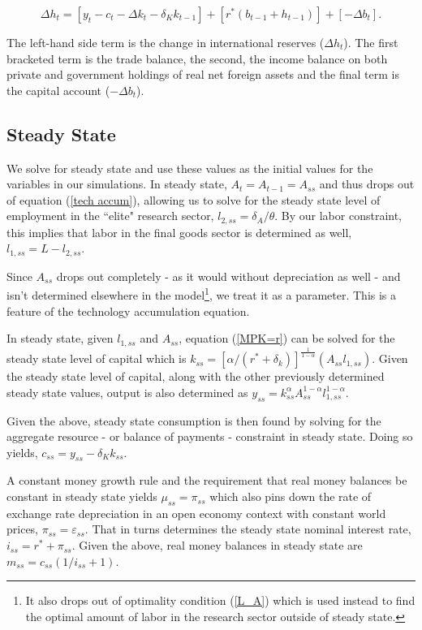\documentclass{OUP-EJ}
\begin{document}
\begin{equation}
    \label{BoP}
    \Delta h_t=[y_t-c_t-\Delta k_t -\delta_K k_{t-1}]+[r^*(b_{t-1}+h_{t-1})] + [-\Delta b_t].
\end{equation}

The left-hand side term is the change in international reserves ($\Delta h_t$). The first bracketed term is the trade balance, the second, the income balance on both private and government holdings of real net foreign assets and the final term is the capital account ($-\Delta b_t$).

\subsection{Steady State}

We solve for steady state and use these values as the initial values for the variables in our simulations.  In steady state, $A_t = A_{t-1}=A_{ss}$ and thus drops out of equation (\ref{tech accum}), allowing us to solve for the steady state level of employment in the ``elite" research sector,  $l_{2,ss} ={\delta_A}/{\theta}$.  By our labor constraint, this implies that labor in the final goods sector is determined as well, $l_{1,ss}=L-l_{2,ss}$.

Since $A_{ss}$ drops out completely - as it would without depreciation as well - and isn't determined elsewhere in the model\footnote{It also drops out of optimality condition (\ref{L_A}) which is used instead to find the optimal amount of labor in the research sector outside of steady state.}, we treat it as a parameter. This is a feature of the \cite{Romer1990} technology accumulation equation.

In steady state, given $l_{1,ss}$ and $A_{ss}$, equation (\ref{MPK=r}) can be solved for the steady state level of capital which is $k_{ss} = \left[{\alpha}/(r^*+\delta_k) \right]^{\frac{1}{1-\alpha}}(A_{ss}l_{1,ss})$.  Given the steady state level of capital, along with the other previously determined steady state values, output is also determined as $y_{ss} = k^{\alpha}_{ss}A_{ss}^{1-\alpha}l_{1,ss}^{1-\alpha}$.

Given the above, steady state consumption is then found by solving for the aggregate resource - or balance of payments - constraint in steady state.  Doing so yields, $c_{ss} = y_{ss}-\delta_K k_{ss}$.

A constant money growth rule and the requirement that real money balances be constant in steady state yields $\mu_{ss}=\pi_{ss}$ which also pins down the rate of exchange rate depreciation in an open economy context with constant world prices, $\pi_{ss}=\varepsilon_{ss}$.  That in turns determines the steady state nominal interest rate, $i_{ss}=r^*+\pi_{ss}$. Given the above, real money balances in steady state are $m_{ss} = c_{ss}\left(1/i_{ss} +1 \right)$.
\end{document}
